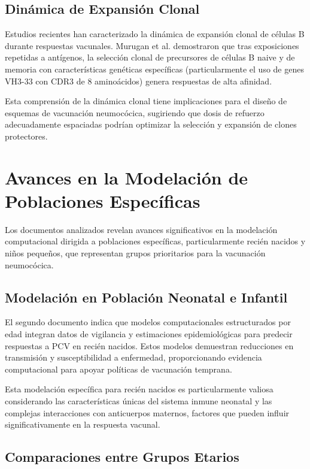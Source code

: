 \subsection{Dinámica de Expansión Clonal}

Estudios recientes han caracterizado la dinámica de expansión clonal de células B durante respuestas vacunales. Murugan et al. \cite{Murugan2018} demostraron que tras exposiciones repetidas a antígenos, la selección clonal de precursores de células B naive y de memoria con características genéticas específicas (particularmente el uso de genes VH3-33 con CDR3 de 8 aminoácidos) genera respuestas de alta afinidad.

Esta comprensión de la dinámica clonal tiene implicaciones para el diseño de esquemas de vacunación neumocócica, sugiriendo que dosis de refuerzo adecuadamente espaciadas podrían optimizar la selección y expansión de clones protectores.

\section{Avances en la Modelación de Poblaciones Específicas}

Los documentos analizados revelan avances significativos en la modelación computacional dirigida a poblaciones específicas, particularmente recién nacidos y niños pequeños, que representan grupos prioritarios para la vacunación neumocócica.

\subsection{Modelación en Población Neonatal e Infantil}

El segundo documento indica que modelos computacionales estructurados por edad integran datos de vigilancia y estimaciones epidemiológicas para predecir respuestas a PCV en recién nacidos. Estos modelos demuestran reducciones en transmisión y susceptibilidad a enfermedad, proporcionando evidencia computacional para apoyar políticas de vacunación temprana.

Esta modelación específica para recién nacidos es particularmente valiosa considerando las características únicas del sistema inmune neonatal y las complejas interacciones con anticuerpos maternos, factores que pueden influir significativamente en la respuesta vacunal.

\subsection{Comparaciones entre Grupos Etarios}

